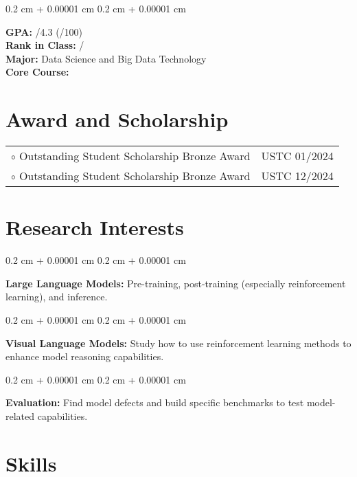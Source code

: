 \documentclass[10pt, letterpaper]{article}
\newenvironment{onecolentry}{
    \begin{adjustwidth}{
        0.2 cm + 0.00001 cm
    }{
        0.2 cm + 0.00001 cm
    }
}{
    \end{adjustwidth}
} %
\begin{document}
    \begin{onecolentry}
        \textbf{GPA:} /4.3 (/100) \\
        \textbf{Rank in Class:}  /  \\
        \textbf{Major:} Data Science and Big Data Technology \\
        \textbf{Core Course:} 
    \end{onecolentry}


    
    \section{Award and Scholarship}

    \begin{tabularx}{\linewidth}{X r}
        $\circ$ Outstanding Student Scholarship Bronze Award & USTC 01/2024 \\
        $\circ$ Outstanding Student Scholarship Bronze Award & USTC 12/2024 \\
    \end{tabularx}
    

    
    \section{Research Interests}
    
    \begin{onecolentry}
        \textbf{Large Language Models:} Pre-training, post-training (especially reinforcement learning), and inference.
    \end{onecolentry}
    
    \vspace{0.1cm}
    
    \begin{onecolentry}
        \textbf{Visual Language Models:} Study how to use reinforcement learning methods to enhance model reasoning capabilities.
    \end{onecolentry}
    
    \vspace{0.1cm}
    
    \begin{onecolentry}
        \textbf{Evaluation:} Find model defects and build specific benchmarks to test model-related capabilities.
    \end{onecolentry}


    \section{Skills}
    
\end{document}
